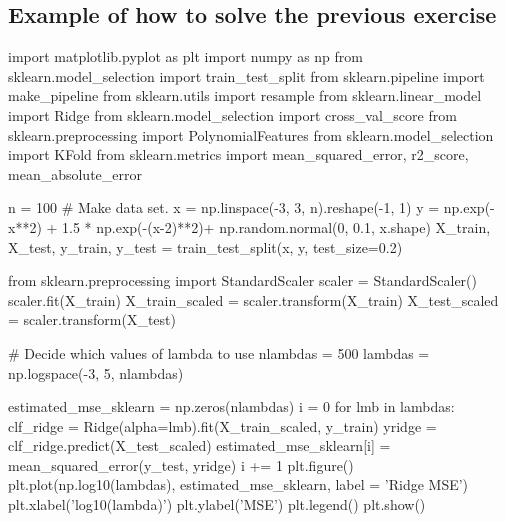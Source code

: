 \documentclass[%
oneside,                 %
final,                   %
10pt]{article}
\begin{document}
\noindent
\subsection{Example of how to solve the previous exercise}

\bpycod
import matplotlib.pyplot as plt
import numpy as np
from sklearn.model_selection import train_test_split
from sklearn.pipeline import make_pipeline
from sklearn.utils import resample
from sklearn.linear_model import Ridge
from sklearn.model_selection import cross_val_score
from sklearn.preprocessing import PolynomialFeatures
from sklearn.model_selection import KFold
from sklearn.metrics import mean_squared_error, r2_score, mean_absolute_error

n = 100
# Make data set.
x = np.linspace(-3, 3, n).reshape(-1, 1)
y = np.exp(-x**2) + 1.5 * np.exp(-(x-2)**2)+ np.random.normal(0, 0.1, x.shape)
X_train, X_test, y_train, y_test = train_test_split(x, y, test_size=0.2)

from sklearn.preprocessing import StandardScaler
scaler = StandardScaler()
scaler.fit(X_train)
X_train_scaled = scaler.transform(X_train)
X_test_scaled = scaler.transform(X_test)



# Decide which values of lambda to use
nlambdas = 500
lambdas = np.logspace(-3, 5, nlambdas)


estimated_mse_sklearn = np.zeros(nlambdas)
i = 0
for lmb in lambdas:
    clf_ridge = Ridge(alpha=lmb).fit(X_train_scaled, y_train)
    yridge = clf_ridge.predict(X_test_scaled)
    estimated_mse_sklearn[i] = mean_squared_error(y_test, yridge)
    i += 1
plt.figure()
plt.plot(np.log10(lambdas), estimated_mse_sklearn, label = 'Ridge MSE')
plt.xlabel('log10(lambda)')
plt.ylabel('MSE')
plt.legend()
plt.show()

\epycod


\end{document}
